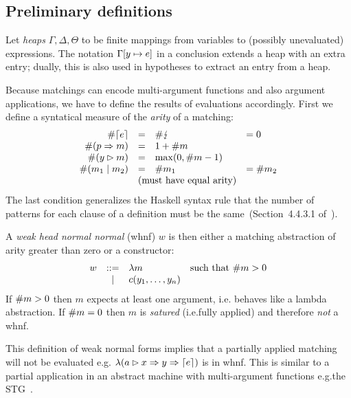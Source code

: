 \subsection{Preliminary definitions}

Let \emph{heaps} $\Gamma, \Delta, \Theta$ to be finite mappings from
variables to (possibly unevaluated) expressions.  The notation
$\Gamma[y \mapsto e]$ in a conclusion extends a heap with an extra
entry; dually, this is also used in hypotheses to extract an entry
from a heap.

Because matchings can encode multi-argument functions and also
argument applications, we have to define the results of evaluations
accordingly. First we define a syntatical measure  of the \emph{arity}
of a matching:
\[
  \begin{array}{rcll}
    \arity{\matchreturn{e}} &=&  \arity{\matchfail} &= 0\\
    \arity{(\matchpat{p}{m})} &=& 1 + \arity{m} \\
    \arity{(\matcharg{y}{m})} &=& \max(0, \arity{m} - 1) \\
     \arity{(\matchalt{m_1}{m_2})} &=& \arity{m_1} &= \arity{m_2} \\
                            & \multicolumn{2}{l}{\text{(must have equal arity)}}
  \end{array}
\]
The last condition generalizes the Haskell syntax rule that the number
of patterns for each clause of a definition must be the
same~(Section~4.4.3.1 of~\cite{haskell_2010_report}).

A \emph{weak head normal normal} (whnf) $w$ is then either
a matching abstraction of arity greater than zero or a constructor:
\[
\begin{array}{rcll}
  w  &::=&  \lambda m & \text{such that}~ \#{m}> 0 \\
     &|& c(y_1,\ldots,y_n)
\end{array}
\]
If $\#{m}>0$ then $m$ expects at least one argument, i.e.\@
behaves like a lambda abstraction.  If $\#{m}= 0$ then $m$ is
\emph{satured} (i.e.\@ fully applied) and therefore \emph{not} a whnf.

This definition of weak normal forms implies that a partially applied
matching will not be evaluated e.g.\@
$\lambda(a\rhd x \Rightarrow y \Rightarrow \left\lceil e\right\rceil)$
is in whnf. This is similar to a partial application in an abstract
machine with multi-argument functions e.g.\@ the STG~\cite{jones_1992}.


